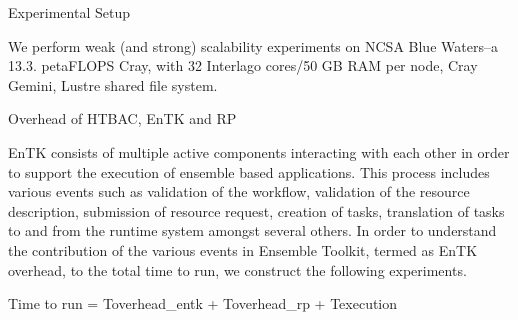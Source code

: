 Experimental Setup

We perform weak (and strong) scalability experiments on NCSA Blue Waters--a 13.3. petaFLOPS Cray, with 32 Interlago cores/50 GB RAM per node, Cray Gemini, Lustre shared file system.	

Overhead of HTBAC, EnTK and RP

EnTK consists of multiple active components interacting with each other in order to support the execution of ensemble based applications. This process includes various events such as validation of the workflow, validation of the resource description, submission of resource request, creation of tasks, translation of tasks to and from the runtime system amongst several others. In order to understand the contribution of the various events in Ensemble Toolkit, termed as EnTK overhead, to the total time to run, we construct the following experiments.

Time to run = Toverhead_entk + Toverhead_rp + Texecution 

